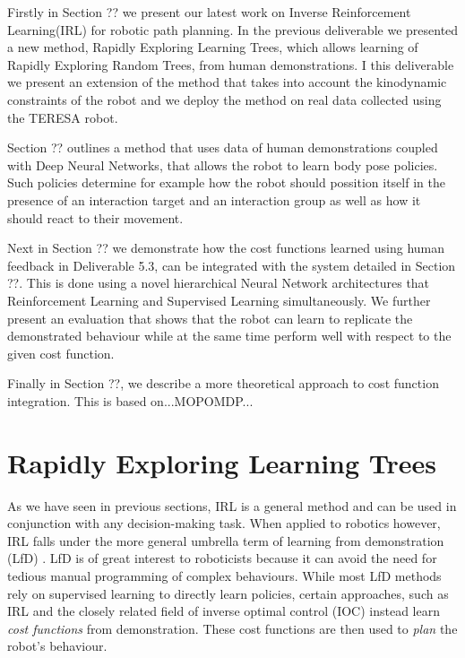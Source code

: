 \documentclass[a4paper,11pt]{report}
\begin{document}
Firstly in Section ?? we present our latest work on Inverse Reinforcement Learning(IRL) for robotic path planning. In the previous deliverable we presented a new method, Rapidly Exploring Learning Trees, which allows learning of Rapidly Exploring Random Trees, from human demonstrations. I this deliverable we present an extension of the method that takes into account the kinodynamic constraints of the robot and we deploy the method on real data collected using the TERESA robot. 

Section ?? outlines a method that uses data of human demonstrations coupled with Deep Neural Networks, that allows the robot to learn body pose policies. Such policies determine for example how the robot should possition itself in the presence of an interaction target and an interaction group as well as how it should react to their movement.

Next in Section ?? we demonstrate how the cost functions learned using human feedback in Deliverable 5.3, can be integrated with the system detailed in Section ??. This is done using a novel hierarchical Neural Network architectures that Reinforcement Learning and Supervised Learning simultaneously. We further present an evaluation that shows that the robot can learn to replicate the demonstrated behaviour while at the same time perform well with respect to the given cost function.  

Finally in Section ??, we describe a more theoretical approach to cost function integration. This is based on...MOPOMDP...

\pagebreak


\section{Rapidly Exploring Learning Trees}
\label{sec:rrt-iros}
As we have seen in previous sections, IRL is a general method and can be used in conjunction with any decision-making task. When applied to robotics however, IRL falls under the more general umbrella term of learning from demonstration (LfD) \cite{argall2009survey}. LfD is of great interest to roboticists because it can avoid the need for tedious manual programming of complex behaviours. While most LfD methods rely on supervised learning to directly learn policies, certain approaches, such as IRL and the closely related field of inverse optimal control (IOC) \cite{kalman1964linear} instead learn \emph{cost functions} from demonstration. These cost functions are then used to \emph{plan} the robot's behaviour. 
\end{document}
